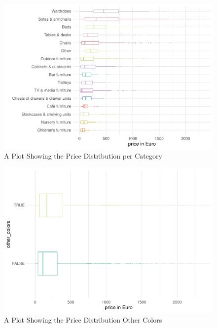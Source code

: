 \documentclass[a4paper, nobind]{templates/ociamthesis}
\begin{document}
\begin{figure}
\includegraphics[width=1\linewidth]{_main_files/figure-latex/price-dist-per-category-1} \caption{A Plot Showing the Price Distribution per Category}\label{fig:price-dist-per-category}
\end{figure}

\begin{figure}
\includegraphics[width=1\linewidth]{_main_files/figure-latex/price-dist-other-colors-1} \caption{A Plot Showing the Price Distribution Other Colors}\label{fig:price-dist-other-colors}
\end{figure}
\end{document}
